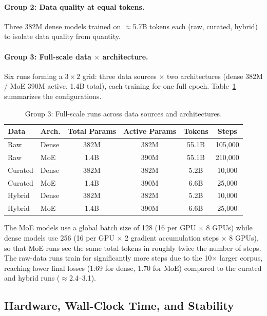\documentclass[10pt]{article}
\begin{document}
\paragraph{Group 2: Data quality at equal tokens.}
Three 382M dense models trained on ${\approx}$5.7B tokens each (raw, curated, hybrid) to isolate data quality from quantity.

\paragraph{Group 3: Full-scale data $\times$ architecture.}
Six runs forming a $3{\times}2$ grid: three data sources $\times$ two architectures (dense 382M / MoE 390M active, 1.4B total), each training for one full epoch.
Table~\ref{tab:group3} summarizes the configurations.

\begin{table}[H]
\centering
\caption{Group 3: Full-scale runs across data sources and architectures.}
\label{tab:group3}
\begin{tabular}{llcccc}
\toprule
\textbf{Data} & \textbf{Arch.} & \textbf{Total Params} & \textbf{Active Params} & \textbf{Tokens} & \textbf{Steps} \\
\midrule
Raw     & Dense & 382M  & 382M & 55.1B & 105,000 \\
Raw     & MoE   & 1.4B  & 390M & 55.1B & 210,000 \\
Curated & Dense & 382M  & 382M & 5.2B  & 10,000  \\
Curated & MoE   & 1.4B  & 390M & 6.6B  & 25,000  \\
Hybrid  & Dense & 382M  & 382M & 5.2B  & 10,000  \\
Hybrid  & MoE   & 1.4B  & 390M & 6.6B  & 25,000  \\
\bottomrule
\end{tabular}
\end{table}

The MoE models use a global batch size of 128 (16 per GPU $\times$ 8 GPUs) while dense models use 256 (16 per GPU $\times$ 2 gradient accumulation steps $\times$ 8 GPUs), so that MoE runs see the same total tokens in roughly twice the number of steps. The raw-data runs train for significantly more steps due to the 10$\times$ larger corpus, reaching lower final losses (1.69 for dense, 1.70 for MoE) compared to the curated and hybrid runs (${\approx}$2.4--3.1).

\subsection{Hardware, Wall-Clock Time, and Stability}
\end{document}
